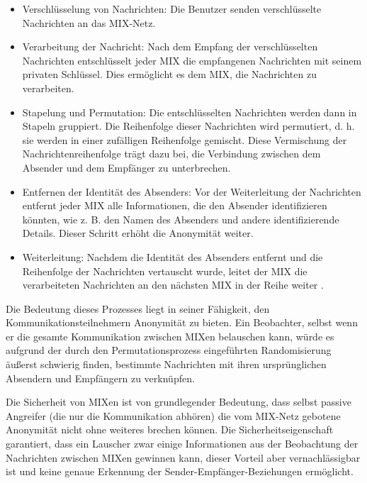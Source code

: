 \begin{itemize}
     
\item Verschlüsselung von Nachrichten: Die Benutzer senden verschlüsselte Nachrichten an das MIX-Netz.

\item Verarbeitung der Nachricht: Nach dem Empfang der verschlüsselten Nachrichten entschlüsselt jeder MIX die empfangenen Nachrichten mit seinem privaten Schlüssel. Dies ermöglicht es dem MIX, die Nachrichten zu verarbeiten.

\item Stapelung und Permutation: Die entschlüsselten Nachrichten werden dann in Stapeln gruppiert. Die Reihenfolge dieser Nachrichten wird permutiert, d. h. sie werden in einer zufälligen Reihenfolge gemischt. Diese Vermischung der Nachrichtenreihenfolge trägt dazu bei, die Verbindung zwischen dem Absender und dem Empfänger zu unterbrechen.

\item Entfernen der Identität des Absenders: Vor der Weiterleitung der Nachrichten entfernt jeder MIX alle Informationen, die den Absender identifizieren könnten, wie z. B. den Namen des Absenders und andere identifizierende Details. Dieser Schritt erhöht die Anonymität weiter.

\item Weiterleitung: Nachdem die Identität des Absenders entfernt und die Reihenfolge der Nachrichten vertauscht wurde, leitet der MIX die verarbeiteten Nachrichten an den nächsten MIX in der Reihe weiter
\footnotemark{}.

\end{itemize}

Die Bedeutung dieses Prozesses liegt in seiner Fähigkeit, den Kommunikationsteilnehmern Anonymität zu bieten. Ein Beobachter, selbst wenn er die gesamte Kommunikation zwischen MIXen belauschen kann, würde es aufgrund der durch den Permutationsprozess eingeführten Randomisierung äußerst schwierig finden, bestimmte Nachrichten mit ihren ursprünglichen Absendern und Empfängern zu verknüpfen.

Die Sicherheit von MIXen ist von grundlegender Bedeutung, dass selbst passive Angreifer (die nur die Kommunikation abhören) die vom MIX-Netz gebotene Anonymität nicht ohne weiteres brechen können. Die Sicherheitseigenschaft garantiert, dass ein Lauscher zwar einige Informationen aus der Beobachtung der Nachrichten zwischen MIXen gewinnen kann, dieser Vorteil aber vernachlässigbar ist und keine genaue Erkennung der Sender-Empfänger-Beziehungen ermöglicht.

